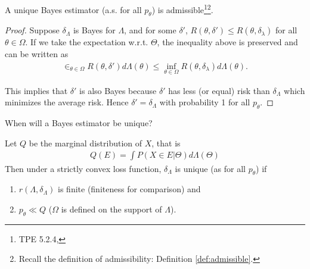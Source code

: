 \begin{theorem}\label{thm:uniqbayesadm}
    A unique Bayes estimator (a.s. for all $p_\theta$) is admissible\footnote{TPE 5.2.4,}\footnote{
    Recall the definition of admissibility: Definition \ref{def:admissible}.}.
\end{theorem}
\begin{proof}
    Suppose $\delta_\Lambda$ is Bayes for $\Lambda$, and for some $\delta'$,
    $R(\theta,\delta')\leq R(\theta, \delta_\lambda)$ for all $\theta\in\Omega$.
    If we take the expectation w.r.t. $\Theta$, the inequality above is preserved and 
    can be written as 
    \begin{gather}
        \in_{\theta\in\Omega}{R(\theta,\delta')}d\Lambda(\theta)
        \leq\inf_{\theta\in\Omega}{R(\theta,\delta_\lambda)}d\Lambda(\theta).
    \end{gather}

    This implies that $\delta'$ is also Bayes 
    because $\delta'$ has less (or equal) risk than $\delta_\Lambda$
    which minimizes the average risk.
    Hence $\delta'=\delta_\Lambda$ with probability 1 for all $p_\theta$.
\end{proof}

\begin{question}
    When will a Bayes estimator be unique?
\end{question}

\begin{theorem}
    Let $Q$ be the marginal distribution of $X$,
    that is 
    \begin{gather}
        Q(E) = \int{P(X\in E|\Theta)}d\Lambda(\Theta)
    \end{gather}
    Then under a strictly convex loss function,
    $\delta_\Lambda$ is unique (as for all $p_\theta$) if 
    \begin{enumerate}[{(i)}]
        \item $r(\Lambda, \delta_\Lambda)$ is finite (finiteness for comparison) and 
        \item $p_\theta\ll Q$ ($\Omega$ is defined on the support of $\Lambda$).
    \end{enumerate}
\end{theorem}

